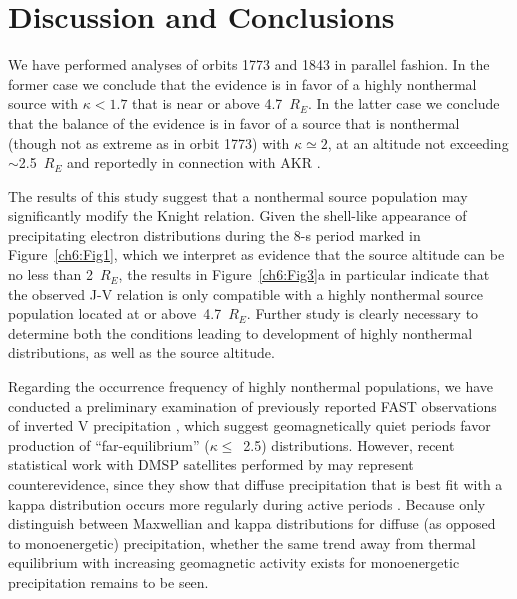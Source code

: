   


  \section{Discussion and Conclusions}

  We have performed analyses of orbits 1773 and 1843 in parallel fashion. In the
  former case we conclude that the evidence is in favor of a highly nonthermal
  source with $\kappa < 1.7$ that is near or above 4.7~$R_E$. In the latter case
  we conclude that the balance of the evidence is in favor of a source that is
  nonthermal (though not as extreme as in orbit 1773) with $\kappa \simeq 2$, at
  an altitude not exceeding $\sim$2.5~$R_E$ and reportedly in connection with
  AKR \citep{Ergun1998}.

  The results of this study suggest that a nonthermal source population may
  significantly modify the Knight relation. Given the shell-like appearance of
  precipitating electron distributions during the 8-s period marked in
  Figure~\ref{ch6:Fig1}, which we interpret as evidence that the source altitude
  can be no less than 2~$R_E$, the results in Figure~\ref{ch6:Fig3}a in
  particular indicate that the observed J-V relation is only compatible with a
  highly nonthermal source population located at or above~4.7~$R_E$. Further
  study is clearly necessary to determine both the conditions leading to
  development of highly nonthermal distributions, as well as the source
  altitude.

  Regarding the occurrence frequency of highly nonthermal populations, we have
  conducted a preliminary examination of previously reported FAST observations
  of inverted V precipitation
  \citep{McFadden1998a,Carlson2001,Janhunen2001,Dombeck2013}, which suggest
  geomagnetically quiet periods favor production of ``far-equilibrium''
  ($\kappa \leq$~2.5) distributions. However, recent statistical work with DMSP
  satellites performed by \citet{McIntosh2014} may represent counterevidence,
  since they show that diffuse precipitation that is best fit with a kappa
  distribution occurs more regularly during active periods \citep[e.g., Figure~7
  in][]{McIntosh2014}. Because \citet{McIntosh2014} only distinguish between
  Maxwellian and kappa distributions for diffuse (as opposed to monoenergetic)
  precipitation, whether the same trend away from thermal equilibrium with
  increasing geomagnetic activity exists for monoenergetic precipitation remains
  to be seen.

